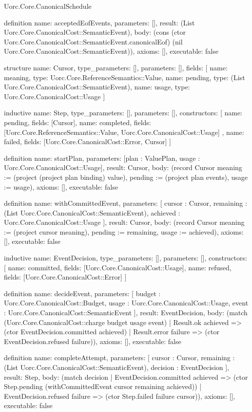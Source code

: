 \begin{lexlean}{Uorc.Core.CanonicalSchedule}
\begin{semanticmodule}
definition{
  name: acceptedEofEvents,
  parameters: [],
  result: (List Uorc.Core.CanonicalCost::SemanticEvent),
  body: (cons (ctor Uorc.Core.CanonicalCost::SemanticEvent.canonicalEof) (nil Uorc.Core.CanonicalCost::SemanticEvent)),
  axioms: [],
  executable: false
}

structure{
  name: Cursor,
  type_parameters: [],
  parameters: [],
  fields: [
    {name: meaning, type: Uorc.Core.ReferenceSemantics::Value},
    {name: pending, type: (List Uorc.Core.CanonicalCost::SemanticEvent)},
    {name: usage, type: Uorc.Core.CanonicalCost::Usage}
  ]
}

inductive{
  name: Step,
  type_parameters: [],
  parameters: [],
  constructors: [
    {name: pending, fields: [Cursor]},
    {
      name: completed,
      fields: [Uorc.Core.ReferenceSemantics::Value, Uorc.Core.CanonicalCost::Usage]
    },
    {name: failed, fields: [Uorc.Core.CanonicalCost::Error, Cursor]}
  ]
}

definition{
  name: startPlan,
  parameters: [plan : ValuePlan, usage : Uorc.Core.CanonicalCost::Usage],
  result: Cursor,
  body: (record Cursor {meaning := (project (project plan binding) value), pending := (project plan events), usage := usage}),
  axioms: [],
  executable: false
}

definition{
  name: withCommittedEvent,
  parameters: [
    cursor : Cursor,
    remaining : (List Uorc.Core.CanonicalCost::SemanticEvent),
    achieved : Uorc.Core.CanonicalCost::Usage
  ],
  result: Cursor,
  body: (record Cursor {meaning := (project cursor meaning), pending := remaining, usage := achieved}),
  axioms: [],
  executable: false
}

inductive{
  name: EventDecision,
  type_parameters: [],
  parameters: [],
  constructors: [
    {name: committed, fields: [Uorc.Core.CanonicalCost::Usage]},
    {name: refused, fields: [Uorc.Core.CanonicalCost::Error]}
  ]
}

definition{
  name: decideEvent,
  parameters: [
    budget : Uorc.Core.CanonicalCost::Budget,
    usage : Uorc.Core.CanonicalCost::Usage,
    event : Uorc.Core.CanonicalCost::SemanticEvent
  ],
  result: EventDecision,
  body: (match (Uorc.Core.CanonicalCost::charge budget usage event)
    | Result.ok achieved => (ctor EventDecision.committed achieved)
    | Result.error failure => (ctor EventDecision.refused failure)),
  axioms: [],
  executable: false
}

definition{
  name: completeAttempt,
  parameters: [
    cursor : Cursor,
    remaining : (List Uorc.Core.CanonicalCost::SemanticEvent),
    decision : EventDecision
  ],
  result: Step,
  body: (match decision
    | EventDecision.committed achieved => (ctor Step.pending (withCommittedEvent cursor remaining achieved))
    | EventDecision.refused failure => (ctor Step.failed failure cursor)),
  axioms: [],
  executable: false
}


\end{semanticmodule}
\end{lexlean}
